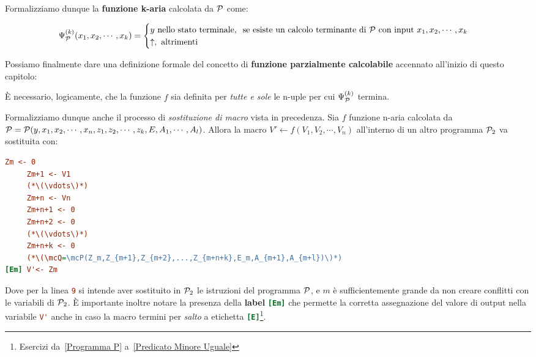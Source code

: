 Formalizziamo dunque la \textbf{funzione k-aria} calcolata da \(\mathcal{P}\) come:

\begin{equation}
  \Psi_{\mathcal{P}}^{(k)}(x_1,x_2,\cdots,x_k)=\begin{cases}
    y \text{ nello stato terminale}, \;\; \text{se esiste un calcolo terminante di } \mathcal{P} \text{ con input } x_1,x_2,\cdots,x_k\\
    \uparrow, \text{ altrimenti}
  \end{cases}
  \label{Funzione k-aria di P Eq}
\end{equation}

Possiamo finalmente dare una definizione formale del concetto di \textbf{funzione parzialmente calcolabile} accennato all'inizio di questo capitolo:


È necessario, logicamente, che la funzione \(f\) sia definita per \textit{tutte e sole} le n-uple per cui \(\Psi_{\mathcal{P}}^{(k)}\) termina.

Formalizziamo dunque anche il processo di \textit{sostituzione di macro} vista in precedenza.
Sia \(f\) funzione n-aria calcolata da \(\mathcal{P}=\mathcal{P}(y,x_1,x_2,\cdots,x_n,z_1,z_2,\cdots,z_k,E,A_1,\cdots,A_l)\). Allora la macro \(V'\leftarrow f(V_1,V_2,\cdots,V_n)\) all'interno di un altro programma \(\mathcal{P}_2\) va sostituita con:
\begin{lstlisting}[language=ini, label={Macro Formalizzata}, caption=Macro]
     Zm <- 0
     Zm+1 <- V1
     (*\(\vdots\)*)
     Zm+n <- Vn
     Zm+n+1 <- 0
     Zm+n+2 <- 0
     (*\(\vdots\)*)
     Zm+n+k <- 0
     (*\(\mcQ=\mcP(Z_m,Z_{m+1},Z_{m+2},...,Z_{m+n+k},E_m,A_{m+1},A_{m+l})\)*)
[Em] V'<- Zm
\end{lstlisting}

Dove per la linea \lstinline[language=ini]{9} si intende aver sostituito in \(\mathcal{P}_2\) le istruzioni del programma \(\mathcal{P}\), e \(m\) è sufficientemente grande da non creare conflitti con le variabili di \(\mathcal{P}_2\). È importante inoltre notare la presenza della \textbf{label} \lstinline[language=ini]{[Em]} che permette la corretta assegnazione del valore di output nella variabile \lstinline[language=ini]{V'} anche in caso la macro termini per \textit{salto} a etichetta \lstinline[language=ini]{[E]}\footnote{Esercizi da~\ref{Programma P} a~\ref{Predicato Minore Uguale}}.

